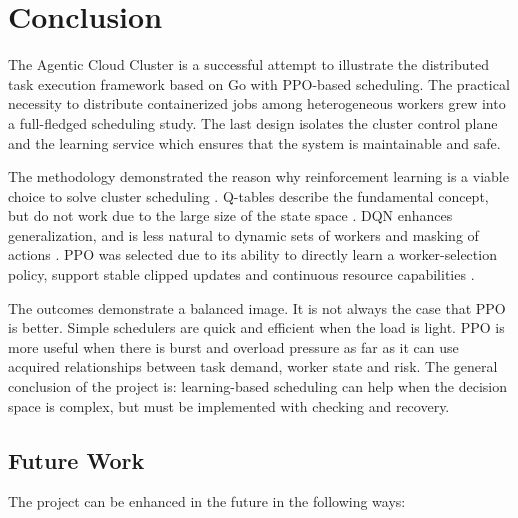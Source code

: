 \chapter{Conclusion}
\label{section:conclusions}

The Agentic Cloud Cluster is a successful attempt to illustrate the distributed task execution framework based on Go with PPO-based scheduling. The practical necessity to distribute containerized jobs among heterogeneous workers grew into a full-fledged scheduling study. The last design isolates the cluster control plane and the learning service which ensures that the system is maintainable and safe.

The methodology demonstrated the reason why reinforcement learning is a viable choice to solve cluster scheduling \cite{sutton2018reinforcement}. Q-tables describe the fundamental concept, but do not work due to the large size of the state space \cite{watkins1992qlearning}. DQN enhances generalization, and is less natural to dynamic sets of workers and masking of actions \cite{mnih2013dqn}. PPO was selected due to its ability to directly learn a worker-selection policy, support stable clipped updates and continuous resource capabilities \cite{gu2025deeprl}.

The outcomes demonstrate a balanced image. It is not always the case that PPO is better. Simple schedulers are quick and efficient when the load is light. PPO is more useful when there is burst and overload pressure as far as it can use acquired relationships between task demand, worker state and risk. The general conclusion of the project is: learning-based scheduling can help when the decision space is complex, but must be implemented with checking and recovery.

\section{Future Work}

The project can be enhanced in the future in the following ways:


